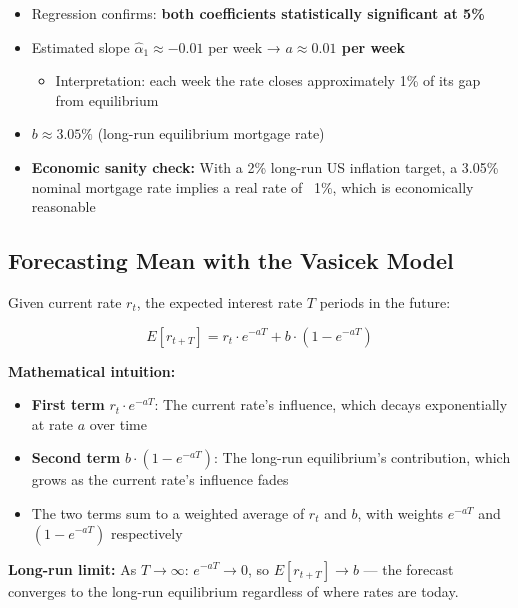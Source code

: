 \documentclass[12pt,openany]{book}
\theoremstyle{definition}
\theoremstyle{remark}
\begin{document}
\begin{itemize}
\item Regression confirms: \textbf{both coefficients statistically significant at 5\%}


\item Estimated slope $\hat{\alpha}_1 \approx -0.01$ per week → \textbf{$a \approx 0.01$ per week}

\begin{itemize}
\item Interpretation: each week the rate closes approximately 1\% of its gap from equilibrium


\end{itemize}

\item \textbf{$b \approx 3.05\%$} (long-run equilibrium mortgage rate)


\item \textbf{Economic sanity check:} With a 2\% long-run US inflation target, a 3.05\% nominal mortgage rate implies a real rate of ~1\%, which is economically reasonable


\end{itemize}
\medskip
\subsection{Forecasting Mean with the Vasicek Model}
Given current rate $r_t$, the expected interest rate $T$ periods in the future:

\[
\boxed{E[r_{t+T}] = r_t \cdot e^{-aT} + b \cdot (1 - e^{-aT})}
\]

\textbf{Mathematical intuition:}

\begin{itemize}
\item \textbf{First term} $r_t \cdot e^{-aT}$: The current rate's influence, which decays exponentially at rate $a$ over time


\item \textbf{Second term} $b \cdot (1 - e^{-aT})$: The long-run equilibrium's contribution, which grows as the current rate's influence fades


\item The two terms sum to a weighted average of $r_t$ and $b$, with weights $e^{-aT}$ and $(1 - e^{-aT})$ respectively


\end{itemize}
\textbf{Long-run limit:} As $T \to \infty$: $e^{-aT} \to 0$, so $E[r_{t+T}] \to b$ --- the forecast converges to the long-run equilibrium regardless of where rates are today.
\end{document}
